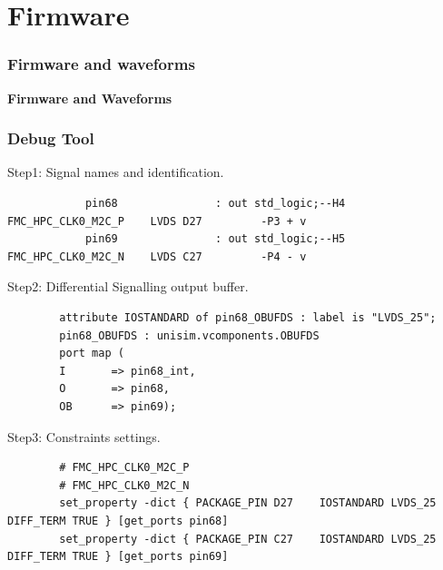 \documentclass[aspectratio=169]{beamer}
\begin{document}
	
	\section{Firmware}
	
	\begin{frame}
	\frametitle{Firmware and waveforms}
	\begin{center}
		{\Huge {}\selectfont \color{blue} \textbf{Firmware and Waveforms}}
	\end{center}
	\end{frame}
	
	
	\begin{frame}[fragile]
	\frametitle{Debug Tool}
	\begin{center}
		{\small \color{blue} Step1: Signal names and identification.}
	\end{center}
	{\tiny
		\begin{verbatim}
			pin68				: out std_logic;--H4  FMC_HPC_CLK0_M2C_P    LVDS D27         -P3 + v
			pin69				: out std_logic;--H5  FMC_HPC_CLK0_M2C_N    LVDS C27         -P4 - v 
		\end{verbatim} }
	\begin{center}
		{\small \color{blue} Step2: Differential Signalling output buffer.}
	\end{center}
	{\tiny
		\begin{verbatim}
		attribute IOSTANDARD of pin68_OBUFDS : label is "LVDS_25";	
		pin68_OBUFDS : unisim.vcomponents.OBUFDS
		port map (
		I		=> pin68_int,
		O		=> pin68,
		OB		=> pin69);		
		\end{verbatim} }
	\begin{center}
		{\small \color{blue} Step3: Constraints settings.}
	\end{center}
	{\tiny
		\begin{verbatim}
		# FMC_HPC_CLK0_M2C_P
		# FMC_HPC_CLK0_M2C_N
		set_property -dict { PACKAGE_PIN D27	IOSTANDARD LVDS_25 DIFF_TERM TRUE }	[get_ports pin68]
		set_property -dict { PACKAGE_PIN C27	IOSTANDARD LVDS_25 DIFF_TERM TRUE }	[get_ports pin69]
		\end{verbatim} }
	\end{frame}
\end{document}
